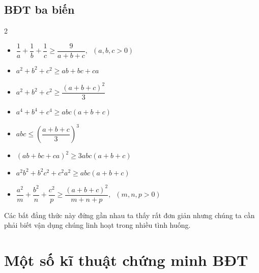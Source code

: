 \subsection{BĐT ba biến}
\begin{multicols}{2}
\begin{itemize}
\item $\dfrac{1}{a}+\dfrac{1}{b}+\dfrac{1}{c}\ge \dfrac{9}{a+b+c},\,\,\,\left( a,b,c>0 \right)$ 
\item ${{a}^{2}}+{{b}^{2}}+{{c}^{2}}\ge ab+bc+ca$ 
\item ${{a}^{2}}+{{b}^{2}}+{{c}^{2}}\ge \dfrac{{{\left( a+b+c \right)}^{2}}}{3}$ 
\item ${{a}^{4}}+{{b}^{4}}+{{c}^{4}}\ge abc\left( a+b+c \right)$
\item $abc\le {{\left( \dfrac{a+b+c}{3} \right)}^{3}}$
\item ${{\left( ab+bc+ca \right)}^{2}}\ge 3abc\left( a+b+c \right)$
\item ${{a}^{2}}{{b}^{2}}+{{b}^{2}}{{c}^{2}}+{{c}^{2}}{{a}^{2}}\ge abc\left( a+b+c \right)$
\item $\dfrac{{{a}^{2}}}{m}+\dfrac{{{b}^{2}}}{n}+\dfrac{{{c}^{2}}}{p}\ge \dfrac{{{\left( a+b+c \right)}^{2}}}{m+n+p},\,\,\,\left( m,n,p> 0 \right)$
\end{itemize}
\end{multicols}
Các bất đẳng thức này đứng gần nhau ta thấy rất đơn giản nhưng chúng ta cần phải biết vận dụng chúng linh hoạt trong nhiều tình huống.
\section{Một số kĩ thuật chứng minh BĐT}
